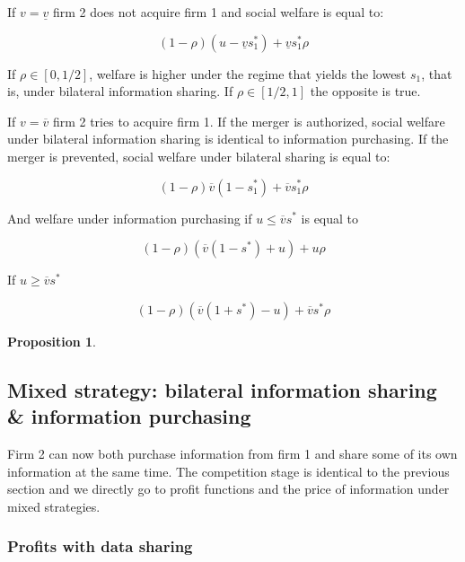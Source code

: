 \documentclass[a4paper,leqno]{article}%
\newtheorem{prop}{Proposition}
\newcommand{\uv}{\underline{v}}
\newcommand{\ov}{\overline{v}}
\begin{document}
\medskip

If $v=\uv$ firm 2 does not acquire firm 1 and social welfare is equal to:

\[
(1-\rho) (u-\uv s_1^*)+\uv s_1^*\rho
\]

\medskip

If $\rho\in[0,1/2]$, welfare is higher under the regime that yields the lowest $s_1$, that is, under bilateral information sharing. If $\rho\in[1/2,1]$ the opposite is true.

\medskip

If $v=\ov$ firm 2 tries to acquire firm 1. If the merger is authorized, social welfare under bilateral information sharing is identical to information purchasing. If the merger is prevented, social welfare under bilateral sharing is equal to:

\medskip

\[
(1-\rho) \ov (1-s_1^*)+\ov s_1^*\rho
\]

\medskip

And welfare under information purchasing if $u\leq \ov s^*$ is equal to

\medskip

\[
(1-\rho) (\ov (1-s^*)+u)+u\rho
\]

\medskip

If $u\geq \ov s^*$ 

\[
(1-\rho) (\ov (1+s^*)-u)+\ov s^*\rho
\]

\medskip

\begin{prop}~~


\end{prop}

\medskip

\subsection{Mixed strategy: bilateral information sharing \& information purchasing}

Firm 2 can now both purchase information from firm 1 and share some of its own information at the same time. The competition stage is identical to the previous section and we directly go to profit functions and the price of information under mixed strategies. 

\medskip

\subsubsection{Profits with data sharing}
\end{document}
